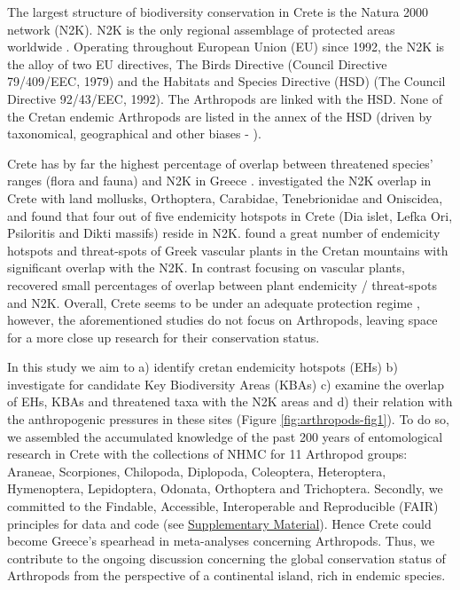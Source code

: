 The largest structure of biodiversity conservation in Crete is the Natura 2000
network (N2K). N2K is the only regional assemblage of protected areas
worldwide \parencite{crofts2014the-european}. Operating throughout European Union (EU) since 1992,
the N2K is the alloy of two EU directives, The Birds Directive (Council Directive 79/409/EEC, 1979)
and the Habitats and Species Directive (HSD) (The Council Directive 92/43/EEC, 1992).
The Arthropods are linked with the HSD. None of the Cretan endemic Arthropods
are listed in the annex of the HSD (driven by taxonomical, geographical and
other biases - \textcite{cardoso2012habitats}).

Crete has by far the highest percentage of overlap between threatened species’
ranges (flora and fauna) and N2K in Greece \parencite{spiliopoulou2021the-natura}.
\textcite{sfenthourakis2001hotspots} investigated the N2K overlap in Crete with
land mollusks, Orthoptera, Carabidae, Tenebrionidae and Oniscidea, and found
that four out of five endemicity hotspots in Crete (Dia islet, Lefka Ori,
Psiloritis and Dikti massifs) reside in N2K. \textcite{kougioumoutzis2021plant}
found a great number of endemicity hotspots and threat-spots of Greek vascular
plants in the Cretan mountains with significant overlap with the N2K.
In contrast \textcite{dimitrakopoulos2004questioning} focusing on vascular plants,
recovered small percentages of overlap between plant endemicity / threat-spots and N2K.
Overall, Crete seems to be under an adequate protection regime \parencite{kougioumoutzis2021extinction,spiliopoulou2021the-natura},
however, the aforementioned studies do not focus on Arthropods, leaving space
for a more close up research for their conservation status.

In this study we aim to a) identify cretan endemicity hotspots (EHs)
b) investigate for candidate Key Biodiversity Areas (KBAs)
c) examine the overlap of EHs, KBAs and threatened taxa with the N2K areas and
d) their relation with the anthropogenic pressures in these sites (Figure \ref{fig:arthropods-fig1}).
To do so, we assembled the accumulated knowledge of the past 200 years of
entomological research in Crete with the collections of NHMC for 11 Arthropod groups:
Araneae, Scorpiones, Chilopoda, Diplopoda, Coleoptera, Heteroptera,
Hymenoptera, Lepidoptera, Odonata, Orthoptera and Trichoptera.
Secondly, we committed to the Findable, Accessible, Interoperable and Reproducible (FAIR) principles \parencite{wilkinson2016the-fair}
for data and code (see \href{https://doi.org/10.5281/zenodo.10635645}{Supplementary Material}). Hence Crete could become Greece’s
spearhead in meta-analyses concerning Arthropods. Thus, we contribute to the
ongoing discussion concerning the global conservation status of Arthropods from
the perspective of a continental island, rich in endemic species.


